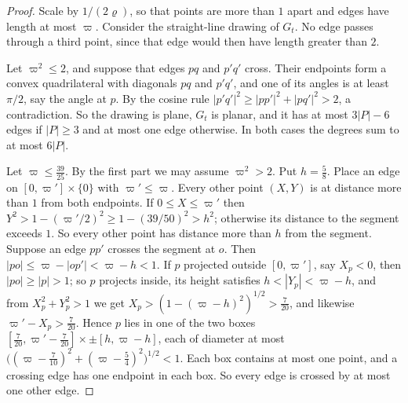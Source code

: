 \documentclass[11pt,colorlinks]{charlie}
\begin{document}
\begin{proof}
Scale by $1/(2\varrho)$, so that points are more than $1$ apart and edges have length at most $\varpi$. Consider the straight-line drawing of $G_t$. No edge passes through a third point, since that edge would then have length greater than $2$.

Let $\varpi^2\le2$, and suppose that edges $pq$ and $p'q'$ cross. Their endpoints form a convex quadrilateral with diagonals $pq$ and $p'q'$, and one of its angles is at least $\pi/2$, say the angle at $p$. By the cosine rule $|p'q'|^2\ge|pp'|^2+|pq'|^2>2$, a contradiction. So the drawing is plane, $G_t$ is planar, and it has at most $3|P|-6$ edges if $|P|\ge3$ and at most one edge otherwise. In both cases the degrees sum to at most $6|P|$.

Let $\varpi\le\tfrac{39}{25}$. By the first part we may assume $\varpi^2>2$. Put $h=\tfrac58$. Place an edge on $[0,\varpi']\times\{0\}$ with $\varpi'\le\varpi$. Every other point $(X,Y)$ is at distance more than $1$ from both endpoints. If $0\le X\le\varpi'$ then $Y^2>1-(\varpi'/2)^2\ge1-(39/50)^2>h^2$; otherwise its distance to the segment exceeds $1$. So every other point has distance more than $h$ from the segment. Suppose an edge $pp'$ crosses the segment at $o$. Then $|po|\le\varpi-|op'|<\varpi-h<1$. If $p$ projected outside $[0,\varpi']$, say $X_p<0$, then $|po|\ge|p|>1$; so $p$ projects inside, its height satisfies $h<|Y_p|<\varpi-h$, and from $X_p^2+Y_p^2>1$ we get $X_p>(1-(\varpi-h)^2)^{1/2}>\tfrac7{20}$, and likewise $\varpi'-X_p>\tfrac7{20}$. Hence $p$ lies in one of the two boxes $[\tfrac7{20},\varpi'-\tfrac7{20}]\times\pm[h,\varpi-h]$, each of diameter at most $\big((\varpi-\tfrac{7}{10})^2+(\varpi-\tfrac54)^2\big)^{1/2}<1$. Each box contains at most one point, and a crossing edge has one endpoint in each box. So every edge is crossed by at most one other edge.


\end{proof}
\end{document}
